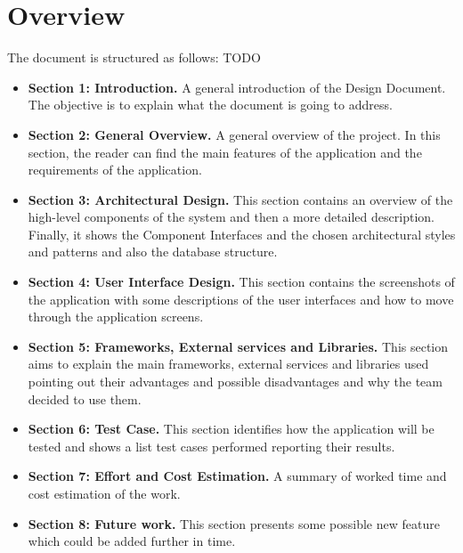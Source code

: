 	\section{Overview}
		The document is structured as follows:
		TODO
		\begin{itemize}
			\item \textbf{Section 1: Introduction.} A general introduction of the Design Document. The objective is to explain what the document is going to address.

			\item \textbf {Section 2: General Overview.} A general overview of the project. In this section, the reader can find the main features of the application and
			the requirements of the application.

			\item \textbf{Section 3: Architectural Design.} This section contains an overview of the high-level components of the system and then a more detailed 
			description. Finally, it shows the Component Interfaces and the chosen architectural styles and patterns and also the database structure.
			
			\item \textbf{Section 4: User Interface Design.} This section contains the screenshots of the application with some descriptions of the user interfaces 
			and how to move through the application screens.
			
			\item \textbf{Section 5: Frameworks, External services and Libraries.} This section aims to explain the main frameworks, external services and libraries used 
			pointing out their advantages and possible disadvantages and why the team decided to use them.
			
			\item \textbf{Section 6: Test Case.} This section identifies how the application will be tested and shows a list test cases performed reporting their results.
			
			\item \textbf{Section 7: Effort and Cost Estimation.} A summary of worked time and cost estimation of the work.
			
			\item \textbf{Section 8: Future work.} This section presents some possible new feature which could be added further in time.
		\end{itemize}